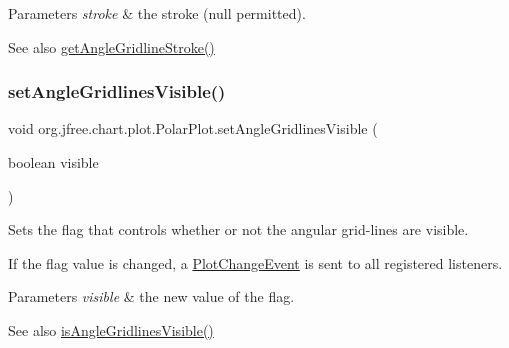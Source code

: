 \begin{DoxyParams}{Parameters}
{\em stroke} & the stroke ({\ttfamily null} permitted).\\
\hline
\end{DoxyParams}
\begin{DoxySeeAlso}{See also}
\mbox{\hyperlink{classorg_1_1jfree_1_1chart_1_1plot_1_1_polar_plot_ae470d6938a98ac9f390c401538c3b546}{get\+Angle\+Gridline\+Stroke()}} 
\end{DoxySeeAlso}
\mbox{\label{classorg_1_1jfree_1_1chart_1_1plot_1_1_polar_plot_aae818235a04355524317e03c5ff60429}} 
\subsubsection{\texorpdfstring{set\+Angle\+Gridlines\+Visible()}{setAngleGridlinesVisible()}}
{\footnotesize\ttfamily void org.\+jfree.\+chart.\+plot.\+Polar\+Plot.\+set\+Angle\+Gridlines\+Visible (\begin{DoxyParamCaption}\item[{boolean}]{visible }\end{DoxyParamCaption})}

Sets the flag that controls whether or not the angular grid-\/lines are visible. 

If the flag value is changed, a \mbox{\hyperlink{}{Plot\+Change\+Event}} is sent to all registered listeners.


\begin{DoxyParams}{Parameters}
{\em visible} & the new value of the flag.\\
\hline
\end{DoxyParams}
\begin{DoxySeeAlso}{See also}
\mbox{\hyperlink{classorg_1_1jfree_1_1chart_1_1plot_1_1_polar_plot_ad7bfe305f21e04763265a67ef06fffac}{is\+Angle\+Gridlines\+Visible()}} 
\end{DoxySeeAlso}
\mbox{\label{classorg_1_1jfree_1_1chart_1_1plot_1_1_polar_plot_aa61cfe599a9676f076e216b90e109327}} 
